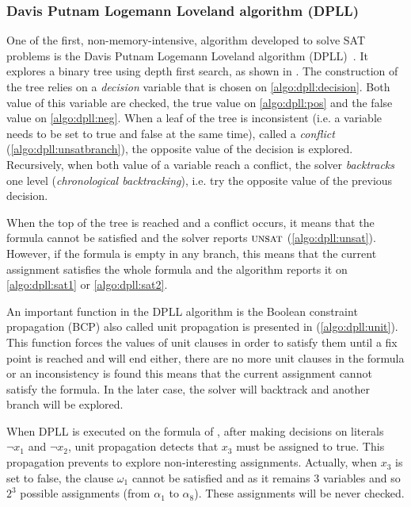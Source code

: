 \subsubsection{Davis Putnam Logemann Loveland algorithm (DPLL)}\label{sec:dpll}
One of the first, non-memory-intensive, algorithm developed to solve SAT problems is 
the Davis Putnam Logemann Loveland algorithm (DPLL)~\cite{dpll_62}. 
It explores a binary tree using depth first search, as shown in .
The construction of the tree  relies on a \emph{decision} variable  that is chosen on \cref{algo:dpll:decision}.
Both value of this variable are checked, the true value on \cref{algo:dpll:pos} and the false value on \cref{algo:dpll:neg}.
When a leaf of the tree is inconsistent (i.e. a variable needs to be set to true and false at the same time), called a \textit{conflict}
 (\cref{algo:dpll:unsatbranch}), the opposite value of the decision is explored.
Recursively, when both value of a variable reach a conflict,
the solver \emph{backtracks} one level (\emph{chronological backtracking}), i.e. try the opposite value of 
the previous decision.

When the top of the tree is reached and a conflict occurs, it means that the formula cannot be satisfied and the 
solver reports $\textsc{unsat}$ (\cref{algo:dpll:unsat}). However, if the formula is empty in any branch, 
this means that the current assignment satisfies the whole formula and the algorithm reports it on \cref{algo:dpll:sat1}
or \ref{algo:dpll:sat2}.



An important function in the DPLL algorithm is the Boolean constraint propagation (BCP) also called unit propagation
is presented in (\cref{algo:dpll:unit}).
This function forces the values of unit clauses in order to satisfy them
until a fix point is reached and will end either, there
are no more unit clauses in the formula or an inconsistency 
is found this means that the current assignment cannot satisfy the formula. 
In the later case, the solver will backtrack and another branch will be explored.



When DPLL is executed on the formula of , after making decisions on literals
$\neg x_1$ and $\neg x_2$, unit propagation detects that $x_3$ must be assigned to true.
This propagation prevents to explore non-interesting assignments. Actually, when $x_3$ is set to false,
the clause $\omega_1$ cannot be satisfied and as it remains 3 variables and so $2^3$ possible assignments
(from $\alpha_1$ to $\alpha_8$). These assignments will be never checked.


